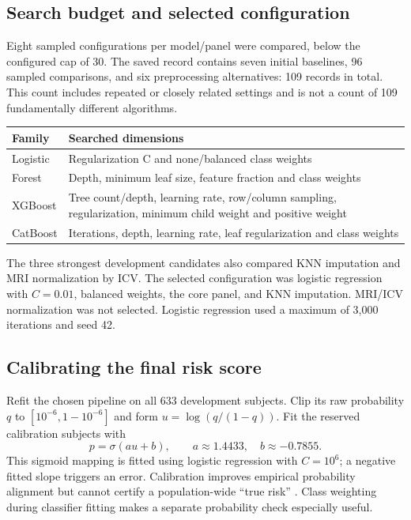 \documentclass[11pt,a4paper]{article}
\begin{document}
\subsection{Search budget and selected configuration}
Eight sampled configurations per model/panel were compared, below the configured cap of 30. The saved record contains seven initial baselines, 96 sampled comparisons, and six preprocessing alternatives: 109 records in total. This count includes repeated or closely related settings and is not a count of 109 fundamentally different algorithms.
\begin{center}\small\renewcommand{\arraystretch}{1.15}
\begin{tabular}{p{.20\linewidth}p{.71\linewidth}}\toprule
Family & Searched dimensions\\\midrule
Logistic & Regularization C and none/balanced class weights\\
Forest & Depth, minimum leaf size, feature fraction and class weights\\
XGBoost & Tree count/depth, learning rate, row/column sampling, regularization, minimum child weight and positive weight\\
CatBoost & Iterations, depth, learning rate, leaf regularization and class weights\\
\bottomrule\end{tabular}\end{center}
The three strongest development candidates also compared KNN imputation and MRI normalization by ICV. The selected configuration was logistic regression with $C=0.01$, balanced weights, the core panel, and KNN imputation. MRI/ICV normalization was not selected. Logistic regression used a maximum of 3,000 iterations and seed 42.
\subsection{Calibrating the final risk score}
Refit the chosen pipeline on all 633 development subjects. Clip its raw probability $q$ to $[10^{-6},1-10^{-6}]$ and form $u=\log(q/(1-q))$. Fit the reserved calibration subjects with
\begin{equation}p=\sigma(au+b),\qquad a\approx1.4433,\quad b\approx-0.7855.\end{equation}
This sigmoid mapping is fitted using logistic regression with $C=10^6$; a negative fitted slope triggers an error. Calibration improves empirical probability alignment but cannot certify a population-wide ``true risk'' \cite{calibration}. Class weighting during classifier fitting makes a separate probability check especially useful.
\end{document}
